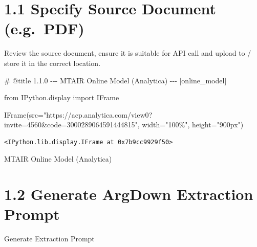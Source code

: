 \documentclass[
  11pt,
  letterpaper,
]{book}
\newenvironment{Shaded}{\begin{snugshade}}{\end{snugshade}}
\newcommand{\CommentTok}[1]{\textcolor[rgb]{0.37,0.37,0.37}{#1}}
\newcommand{\ImportTok}[1]{\textcolor[rgb]{0.00,0.46,0.62}{#1}}
\newcommand{\NormalTok}[1]{\textcolor[rgb]{0.00,0.23,0.31}{#1}}
\newcommand{\OperatorTok}[1]{\textcolor[rgb]{0.37,0.37,0.37}{#1}}
\newcommand{\StringTok}[1]{\textcolor[rgb]{0.13,0.47,0.30}{#1}}
\begin{document}
\section{1.1 Specify Source Document
(e.g.~PDF)}\label{specify-source-document-e.g.-pdf}

Review the source document, ensure it is suitable for API call and
upload to / store it in the correct location.

\begin{Shaded}
\begin{Highlighting}[]
\CommentTok{\# @title 1.1.0 {-}{-}{-} MTAIR Online Model (Analytica) {-}{-}{-} [online\_model]}

\ImportTok{from}\NormalTok{ IPython.display }\ImportTok{import}\NormalTok{ IFrame}

\NormalTok{IFrame(src}\OperatorTok{=}\StringTok{"https://acp.analytica.com/view0?invite=4560\&code=3000289064591444815"}\NormalTok{, width}\OperatorTok{=}\StringTok{"100\%"}\NormalTok{, height}\OperatorTok{=}\StringTok{"900px"}\NormalTok{)}
\end{Highlighting}
\end{Shaded}

\label{online_model}
\begin{verbatim}
<IPython.lib.display.IFrame at 0x7b9cc9929f50>
\end{verbatim}

MTAIR Online Model (Analytica)

\section{1.2 Generate ArgDown Extraction
Prompt}\label{generate-argdown-extraction-prompt}

Generate Extraction Prompt
\end{document}
